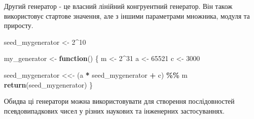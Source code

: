 \documentclass[
]{article}
\newenvironment{Shaded}{\begin{snugshade}}{\end{snugshade}}
\newcommand{\ControlFlowTok}[1]{\textcolor[rgb]{0.13,0.29,0.53}{\textbf{#1}}}
\newcommand{\DecValTok}[1]{\textcolor[rgb]{0.00,0.00,0.81}{#1}}
\newcommand{\FunctionTok}[1]{\textcolor[rgb]{0.13,0.29,0.53}{\textbf{#1}}}
\newcommand{\NormalTok}[1]{#1}
\newcommand{\OtherTok}[1]{\textcolor[rgb]{0.56,0.35,0.01}{#1}}
\newcommand{\SpecialCharTok}[1]{\textcolor[rgb]{0.81,0.36,0.00}{\textbf{#1}}}
\begin{document}
Другий генератор - це власний лінійний конгруентний генератор. Він також
використовує стартове значення, але з іншими параметрами множника,
модуля та приросту.

\begin{Shaded}
\begin{Highlighting}[]
\NormalTok{seed\_mygenerator }\OtherTok{\textless{}{-}} \DecValTok{2}\SpecialCharTok{\^{}}\DecValTok{10}

\NormalTok{my\_generator }\OtherTok{\textless{}{-}} \ControlFlowTok{function}\NormalTok{() \{}
\NormalTok{  m }\OtherTok{\textless{}{-}} \DecValTok{2}\SpecialCharTok{\^{}}\DecValTok{31}
\NormalTok{  a }\OtherTok{\textless{}{-}} \DecValTok{65521}
\NormalTok{  c }\OtherTok{\textless{}{-}} \DecValTok{3000}
  
\NormalTok{  seed\_mygenerator }\OtherTok{\textless{}\textless{}{-}}\NormalTok{ (a }\SpecialCharTok{*}\NormalTok{ seed\_mygenerator }\SpecialCharTok{+}\NormalTok{ c) }\SpecialCharTok{\%\%}\NormalTok{ m}
  \FunctionTok{return}\NormalTok{(seed\_mygenerator)}
\NormalTok{\}}
\end{Highlighting}
\end{Shaded}

Обидва ці генератори можна використовувати для створення послідовностей
псевдовипадкових чисел у різних наукових та інженерних застосуваннях.
\end{document}
